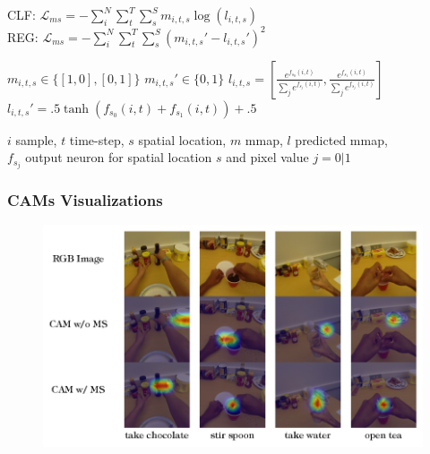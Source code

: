 \documentclass{beamer}
\begin{document}
\begin{frame}
\begin{adjustwidth}{-1.75em}{-1.75em}
\begin{itemize}
	\begin{minipage}{.6\textwidth}
		CLF: $ {\displaystyle \mathcal{L}_{ms} = -\sum_i^N\sum_t^T\sum_s^S{m_{i,t,s} \log (l_{i,t,s}) } }$ \\
		REG: $ {\displaystyle \mathcal{L}_{ms} = -\sum_i^N\sum_t^T\sum_s^S{(m_{i,t,s}' - l_{i,t,s}')^2 } }$
	\end{minipage}%
	\begin{minipage}{.4\textwidth}
		\begin{flushright}
		${ \scriptstyle m_{i,t,s} \in \{ [1, 0], [0, 1] \} }$ 
		${ \scriptstyle m_{i,t,s}' \in \{ 0, 1 \} }$
		${ \scriptstyle l_{i,t,s} = \left [ \frac{e^{f_{s_0}(i, t)}}{\sum_j e^{f_{s_j}(i, t)}}, \frac{e^{f_{s_1}(i, t)}}{\sum_j e^{f_{s_j}(i, t)}} \right ] }$ \\
		${ \scriptstyle l_{i,t,s}' =  .5 \tanh (f_{s_0}(i, t) + f_{s_1}(i, t)) + .5 }$
		\end{flushright}
	\end{minipage}

	{\scriptsize $i$ sample, $t$ time-step, $s$ spatial location, $m$ mmap, $l$ predicted mmap, \\ \vspace*{-5pt} $f_{s_j}$ output neuron for spatial location $s$ and pixel value $j = 0|1$}

	
\end{itemize}

\end{adjustwidth}
\end{frame}

\begin{frame}
\frametitle{CAMs Visualizations}

\begin{figure}
\includegraphics[width=\textwidth]{./schemi/cams_img}
\end{figure}

\end{frame}
\end{document}
